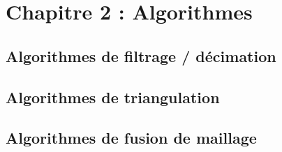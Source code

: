 \chapter{Chapitre 2 : Algorithmes}


\section{Algorithmes de filtrage / décimation}

\section{Algorithmes de triangulation}
\section{Algorithmes de fusion de maillage}
